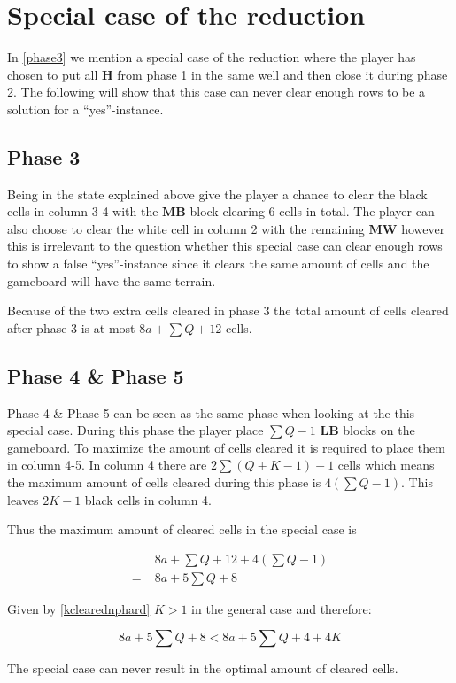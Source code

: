 \section{Special case of the reduction}
\label{specialcasereduction}

In \ref{phase3} we mention a special case of the reduction where the player has chosen to put all $\mathbf{H}$ from phase 1 in the same well and then close it during phase 2. The following will show that this case can never clear enough rows to be a solution for a ``yes''-instance.

\subsection{Phase 3}
Being in the state explained above give the player a chance to clear the black cells in column 3-4 with the $\mathbf{MB}$ block clearing 6 cells in total. The player can also choose to clear the white cell in column 2 with the remaining $\mathbf{MW}$ however this is irrelevant to the question whether this special case can clear enough rows to show a false ``yes''-instance since it clears the same amount of cells and the gameboard will have the same terrain.

Because of the two extra cells cleared in phase 3 the total amount of cells cleared after phase 3 is at most $8a + \sum Q + 12$ cells.

\subsection{Phase 4 \& Phase 5}

Phase 4 \& Phase 5 can be seen as the same phase when looking at the this special case. During this phase the player place $\sum Q - 1$ $\mathbf{LB}$ blocks on the gameboard. To maximize the amount of cells cleared it is required to place them in column 4-5. In column 4 there are $2 \sum \left( Q + K - 1 \right) - 1$ cells which means the maximum amount of cells cleared during this phase is $ 4 \left( \sum Q - 1 \right)$. This leaves $2K-1$ black cells in column 4.

Thus the maximum amount of cleared cells in the special case is

\begin{align*}
  & 8a + \sum Q + 12 + 4 \left( \sum Q - 1 \right) \\
= \; & 8a + 5 \sum Q + 8
\end{align*}

Given by \ref{kclearednphard} $K > 1$ in the general case and therefore: 

\begin{equation*}
8a + 5 \sum Q + 8 < 8a + 5 \sum Q + 4 + 4K
\end{equation*}

\begin{cor}
The special case can never result in the optimal amount of cleared cells.
\end{cor}
